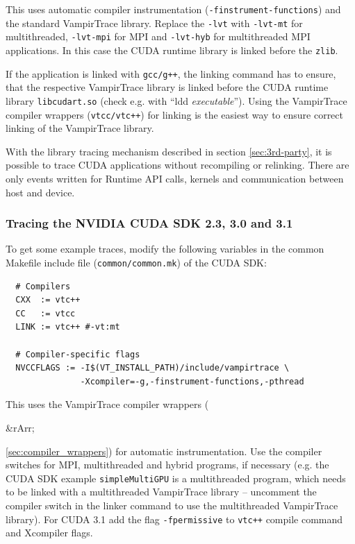 \documentclass[a4paper,twoside,12pt,BCOR12mm]{scrbook}
\newcommand{\rarr}{$\Rightarrow$}  %
\renewcommand{\rarr}{\begin{rawhtml}&rArr;\end{rawhtml}}   %
\begin{document}
  \noindent This uses automatic compiler instrumentation (\texttt{-finstrument-functions}) 
  and the standard VampirTrace library. Replace the \texttt{-lvt} with 
  \texttt{-lvt-mt} for multithreaded, \texttt{-lvt-mpi} for MPI and 
  \texttt{-lvt-hyb} for multithreaded MPI applications. In this case the CUDA 
  runtime library is linked before the \texttt{zlib}.

  If the application is linked with \texttt{gcc/g++}, the linking command has to ensure, 
  that the respective VampirTrace library is linked before the CUDA runtime 
  library \texttt{libcudart.so} (check e.g. with ``ldd \textit{executable}''). 
  Using the VampirTrace compiler wrappers (\texttt{vtcc/vtc++}) for linking is 
  the easiest way to ensure correct linking of the VampirTrace library.
 
  With the library tracing mechanism described in section \ref{sec:3rd-party}, 
  it is possible to trace CUDA applications without recompiling or relinking. 
  There are only events written for Runtime API calls, kernels and communication 
  between host and device.

  \subsubsection*{Tracing the NVIDIA CUDA SDK 2.3, 3.0 and 3.1}
  To get some example traces, modify the following variables in the common 
  Makefile include file (\texttt{common/common.mk}) of the CUDA SDK:
  \begin{small}\begin{verbatim}
  # Compilers
  CXX  := vtc++
  CC   := vtcc
  LINK := vtc++ #-vt:mt

  # Compiler-specific flags
  NVCCFLAGS := -I$(VT_INSTALL_PATH)/include/vampirtrace \
               -Xcompiler=-g,-finstrument-functions,-pthread
  \end{verbatim}\end{small}
  This uses the VampirTrace compiler wrappers (\rarr\ref{sec:compiler_wrappers}) for 
  automatic instrumentation. Use the compiler switches for MPI, multithreaded 
  and hybrid programs, if necessary (e.g. the CUDA SDK example 
  \texttt{simpleMultiGPU} is a multithreaded program, which needs to be linked 
  with a multithreaded VampirTrace library -- uncomment the compiler switch 
  in the linker command to use the multithreaded VampirTrace library). 
  For CUDA 3.1 add the flag \texttt{-fpermissive} to \texttt{vtc++} compile 
  command and Xcompiler flags. \bigskip\\
\end{document}
